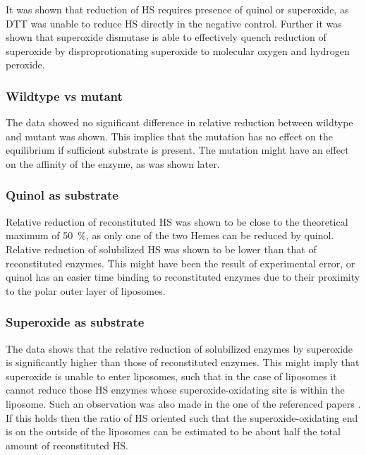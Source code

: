 It was shown that reduction of HS requires presence of quinol or superoxide, as
DTT was unable to reduce HS directly in the negative control. Further it was
shown that superoxide dismutase is able to effectively quench reduction of
superoxide by disproprotionating superoxide to molecular oxygen and hydrogen
peroxide.


\subsubsection{Wildtype vs mutant}

The data showed no significant difference in relative reduction between
wildtype and mutant was shown. This implies that the mutation has no effect on
the equilibrium if sufficient substrate is present. The mutation might have an
effect on the affinity of the enzyme, as was shown later.

\subsubsection{Quinol as substrate}

Relative reduction of reconstituted HS was shown to be close to the theoretical
maximum of \SI{50}{\percent}, as only one of the two Hemes can be reduced by
quinol. Relative reduction of solubilized HS was shown to be lower than that of
reconstituted enzymes. This might have been the result of experimental error,
or quinol has an easier time binding to reconstituted enzymes due to their
proximity to the polar outer layer of liposomes.

\subsubsection{Superoxide as substrate}

The data shows that the relative reduction of solubilized enzymes by superoxide
is significantly higher than those of reconstituted enzymes. This might imply
that superoxide is unable to enter liposomes, such that in the case of
liposomes it cannot reduce those HS enzymes whose superoxide-oxidating site is
within the liposome. Such an observation was also made in the one of the
referenced papers \cite{superoxide_salvaging}. If this holds then the ratio of
HS oriented such that the superoxide-oxidating end is on the outside of the
liposomes can be estimated to be about half the total amount of reconstituted
HS.

